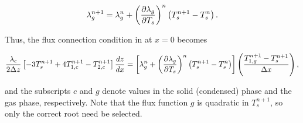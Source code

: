 \begin{equation}
\lambda_g^{n+1}=\lambda_g^n + \left({\partial \lambda_g \over \partial T_s}\right)^n
\left( T_s^{n+1}-T_s^n \right).
\end{equation}

Thus, the flux connection condition in  at $x=0$ becomes

\begin{equation}
{\lambda_c \over 2 \Delta z} \left[ -3T_s^{n+1} + 4T_{1,c}^{n+1}-T_{2,c}^{n+1}\right]
{dz \over dx}=
\left[ \lambda_g^n + \left({\partial \lambda_g \over \partial T_s}\right)^n
\left( T_s^{n+1}-T_s^n \right) \right]
 \left( {{T_{1,g}^{n+1}-T_s^{n+1}} \over \Delta x} \right),
\label{eq:noburn}
\end{equation}

and the subscripts $c$ and $g$ denote values in the solid (condensed) phase and the gas phase, respectively. Note that the flux function $g$ is quadratic in $T_s^{n+1}$, so only the correct root need be selected.